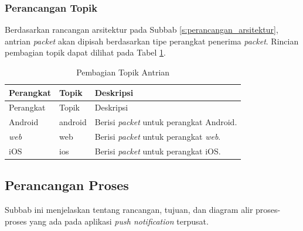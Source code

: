 \subsubsection{Perancangan Topik}
\par Berdasarkan rancangan arsitektur pada Subbab \ref{s:perancangan_arsitektur}, antrian \textit{packet} akan dipisah berdasarkan tipe perangkat penerima \textit{packet}. Rincian pembagian topik dapat dilihat pada Tabel \ref{t:pembagian_topik_antrian}.
\begin{longtable}{|p{2cm}|p{2cm}|p{5cm}|}
	\caption{Pembagian Topik Antrian} \label{t:pembagian_topik_antrian} \\ \hline
	\rowcolor{lightgray} Perangkat & Topik & Deskripsi \\ \hline
	\endfirsthead
	\hline
	\rowcolor{lightgray} Perangkat & Topik & Deskripsi \\ \hline
	\endhead
	Android & android & Berisi \textit{packet} untuk perangkat Android. \\ \hline
	\textit{web} & web & Berisi \textit{packet} untuk perangkat \textit{web}. \\ \hline
	iOS & ios & Berisi \textit{packet} untuk perangkat iOS. \\ \hline
\end{longtable}

\subsection{Perancangan Proses}
\par Subbab ini menjelaskan tentang rancangan, tujuan, dan diagram alir proses-proses yang ada pada aplikasi \textit{push notification} terpusat.

\clearpage
